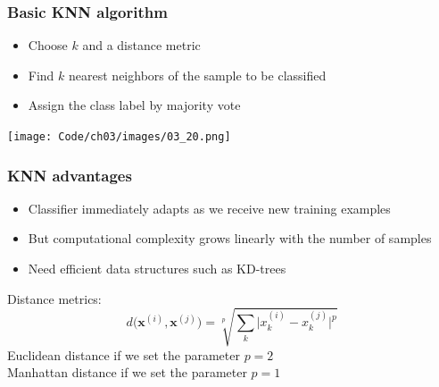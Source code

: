 \documentclass{beamer}
\begin{document}
\begin{frame}
  \frametitle{Basic KNN algorithm}
  \begin{itemize}
  \item Choose $k$ and a distance metric
  \item Find $k$ nearest neighbors of the sample to be classified
  \item Assign the class label by majority vote
  \end{itemize}
\end{frame}

\begin{frame}
  \texttt{[image: Code/ch03/images/03\_20.png]}
\end{frame}

\begin{frame}
  \frametitle{KNN advantages}
  \begin{itemize}
  \item Classifier immediately adapts as we receive new training examples
  \item But computational complexity grows linearly with the number of samples
  \item Need efficient data structures such as KD-trees
  \end{itemize}
  Distance metrics:
  \[
  d \big(\mathbf{x}^{(i)}, \mathbf{x}^{(j)}\big) =  \sqrt[p]{\sum_k \big| x_{k}^{(i)} - x_{k}^{(j)} \big|^p } 
  \]
  Euclidean distance if we set the parameter $p=2$ \\
  Manhattan distance if we set the parameter $p=1$
\end{frame}
\end{document}

